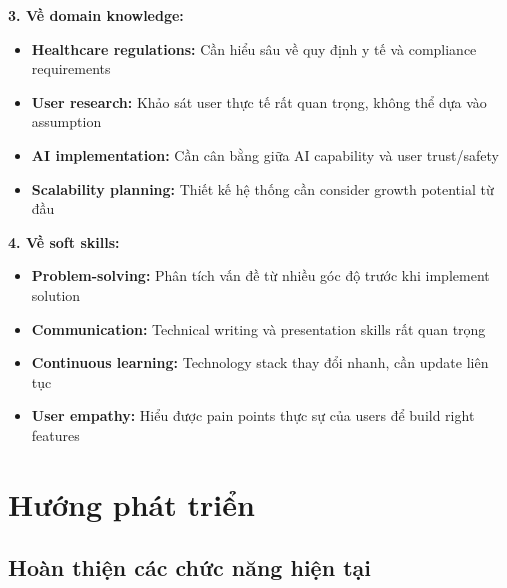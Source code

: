 \documentclass[../DoAn.tex]{subfiles}
\begin{document}
\textbf{3. Về domain knowledge:}
\begin{itemize}
    \item \textbf{Healthcare regulations:} Cần hiểu sâu về quy định y tế và compliance requirements
    \item \textbf{User research:} Khảo sát user thực tế rất quan trọng, không thể dựa vào assumption
    \item \textbf{AI implementation:} Cần cân bằng giữa AI capability và user trust/safety
    \item \textbf{Scalability planning:} Thiết kế hệ thống cần consider growth potential từ đầu
\end{itemize}

\textbf{4. Về soft skills:}
\begin{itemize}
    \item \textbf{Problem-solving:} Phân tích vấn đề từ nhiều góc độ trước khi implement solution
    \item \textbf{Communication:} Technical writing và presentation skills rất quan trọng
    \item \textbf{Continuous learning:} Technology stack thay đổi nhanh, cần update liên tục
    \item \textbf{User empathy:} Hiểu được pain points thực sự của users để build right features
\end{itemize}

\section{Hướng phát triển}

\subsection{Hoàn thiện các chức năng hiện tại}
\end{document}
